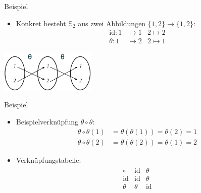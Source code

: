 \documentclass{beamer}
\renewcommand\SS{\mathbb S}
\newcommand{\id}{\mathrm{id}}
\newcommand{\ue}{\"u}
\begin{document}
\begin{frame}
\begin{overprint}
\begin{block}{Beispiel}
			\begin{itemize}
				\item Konkret besteht $\SS_2$ aus zwei Abbildungen $\{1,2\}\to\{1,2\}$:
					\begin{align*}
						\id:1&\mapsto1&2\mapsto2\\
						\theta:1&\mapsto2&2\mapsto1
					\end{align*}
			\end{itemize}	
		\end{block}
		\hfill\includegraphics[height=20mm]{pics/thetatheta.pdf}
		\begin{block}{Beispiel}
			\begin{itemize}
			\item Beispielverkn\ue pfung $\theta\circ\theta$:
					\begin{align*}
						\theta\circ\theta(1)&=\theta(\theta(1))=\theta(2)=1\\
						\theta\circ\theta(2)&=\theta(\theta(2))=\theta(1)=2
					\end{align*}
				\item Verkn\ue pfungstabelle:
					\begin{align*}
						\begin{array}{c|c|c}
							\circ&\id&\theta\\\hline
							\id&\id&\theta\\\hline
							\theta&\theta&\id
						\end{array}
					\end{align*}
			\end{itemize}	
		\end{block}
	\end{overprint}
\end{frame}
\end{document}
